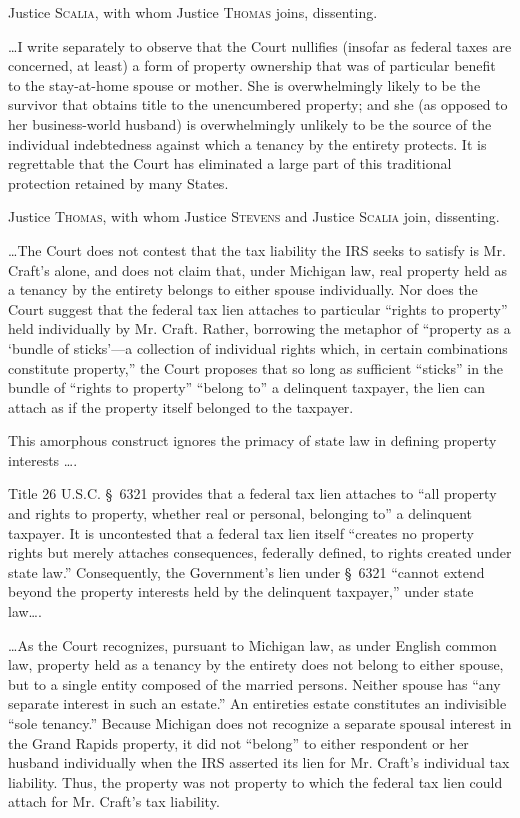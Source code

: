 \opinion Justice \textsc{Scalia}, with whom Justice \textsc{Thomas} joins,
dissenting.

\dots I write separately to observe that the Court nullifies (insofar as
federal taxes are concerned, at least) a form of property ownership that was of
particular benefit to the stay-at-home spouse or mother. She is overwhelmingly
likely to be the survivor that obtains title to the unencumbered property; and
she (as opposed to her business-world husband) is overwhelmingly unlikely to be
the source of the individual indebtedness against which a tenancy by the
entirety protects. It is regrettable that the Court has eliminated a large part
of this traditional protection retained by many States.

\opinion Justice \textsc{Thomas}, with whom Justice \textsc{Stevens} and Justice
\textsc{Scalia} join, dissenting.

\dots The Court does not contest that the tax liability the IRS seeks to
satisfy is Mr. Craft's alone, and does not claim that, under Michigan law, real
property held as a tenancy by the entirety belongs to either spouse
individually. Nor does the Court suggest that the federal tax lien attaches to
particular ``rights to property'' held individually by Mr. Craft. Rather,
borrowing the metaphor of ``property as a `bundle of sticks'---a collection of
individual rights which, in certain combinations constitute property,'' the
Court proposes that so long as sufficient ``sticks'' in the bundle of ``rights
to property'' ``belong to'' a delinquent taxpayer, the lien can attach as if
the property itself belonged to the taxpayer.

This amorphous construct ignores the primacy of state law in defining property
interests \dots.


Title 26 U.S.C. \S~6321 provides that a federal tax lien attaches to ``all
property and rights to property, whether real or personal, belonging to'' a
delinquent taxpayer. It is uncontested that a federal tax lien itself ``creates
no property rights but merely attaches consequences, federally defined, to
rights created under state law.'' Consequently, the Government's lien under
\S~6321 ``cannot extend beyond the property interests held by the delinquent
taxpayer,'' under state law\dots.


\dots As the Court recognizes, pursuant to Michigan law, as under English
common law, property held as a tenancy by the entirety does not belong to
either spouse, but to a single entity composed of the married persons. Neither
spouse has ``any separate interest in such an estate.'' An entireties estate
constitutes an indivisible ``sole tenancy.'' Because Michigan does not
recognize a separate spousal interest in the Grand Rapids property, it did not
``belong'' to either respondent or her husband individually when the IRS
asserted its lien for Mr. Craft's individual tax liability. Thus, the property
was not property to which the federal tax lien could attach for Mr. Craft's tax
liability.

